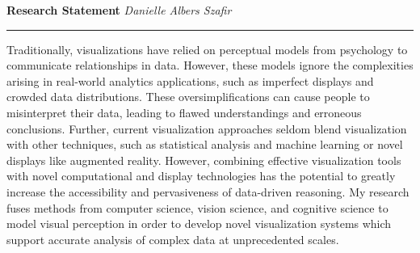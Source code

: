 \documentclass[11pt]{article}
\begin{document}
\setlength{\belowcaptionskip}{-10pt}

\thispagestyle{fancy}

\textbf{\Large Research Statement}
{\hspace{220pt}\emph{Danielle Albers Szafir} \vspace{3pt}}
\hrule


Traditionally, visualizations have relied on perceptual models from psychology to communicate relationships in data.  However, these models ignore the complexities arising in real-world analytics applications, such as imperfect displays and crowded data distributions. These oversimplifications can cause people to misinterpret their data, leading to flawed understandings and erroneous conclusions. Further, current visualization approaches seldom blend visualization with other techniques, such as statistical analysis and machine learning or novel displays like augmented reality. However, combining effective visualization tools with novel computational and display technologies has the potential to greatly increase the accessibility and pervasiveness of data-driven reasoning. My research fuses methods from computer science, vision science, and cognitive science to model visual perception in order to develop novel visualization systems which support accurate analysis of complex data at unprecedented scales.
\end{document}
